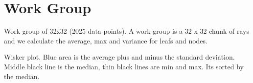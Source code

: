 
\section{Work Group}



Work group of 32x32 (2025 data points). A work group is a 32 x 32 chunk of rays and we calculate the average, max and variance for leafs and nodes. 

Wisker plot. Blue area is the average plus and minus the standard deviation. Middle black line is the median, thin black lines are min and max. Its sorted by the median.

\iffalse
\begin{minipage}[t]{0.9\textwidth}
	\begin{tikzpicture}
	\begin{axis}
	[
	view={0}{0},
	xlabel = max node intersections,
	ylabel = standard deviation,
	cycle list name = linestyles*,
	legend style={at={(0.05,0.95)}, anchor = north west},
	]
	\addplot+[mark=square*, only marks, mark options={scale=0.2},scatter, scatter/use mapped color= {draw opacity = 0}, opacity = 0.2]table[x = nodeMax, y = nodeStandardDeviation, col sep=comma]{Data/amazonLumberyardInterior_b4_l4_WorkGroupDepthInfo.txt};			
	
	\end{axis}
	\end{tikzpicture}
\end{minipage}


\begin{minipage}[t]{0.9\textwidth}
	\begin{tikzpicture}
	\begin{axis}
	[
	view={0}{0},
	xlabel = max leaf intersections,
	ylabel = standard deviation,
	cycle list name = linestyles*,
	legend style={at={(0.05,0.95)}, anchor = north west},
	]
	\addplot[only marks,mark=square*, mark options={scale=0.5},scatter, scatter/use mapped color= {draw opacity = 0}, opacity = 0.1] table[x = leafMax, y = leafStandardDeviation, col sep=comma]{Data/amazonLumberyardInterior_b4_l4_WorkGroupDepthInfo.txt};			
	
	\end{axis}
	\end{tikzpicture}
\end{minipage}
\fi

